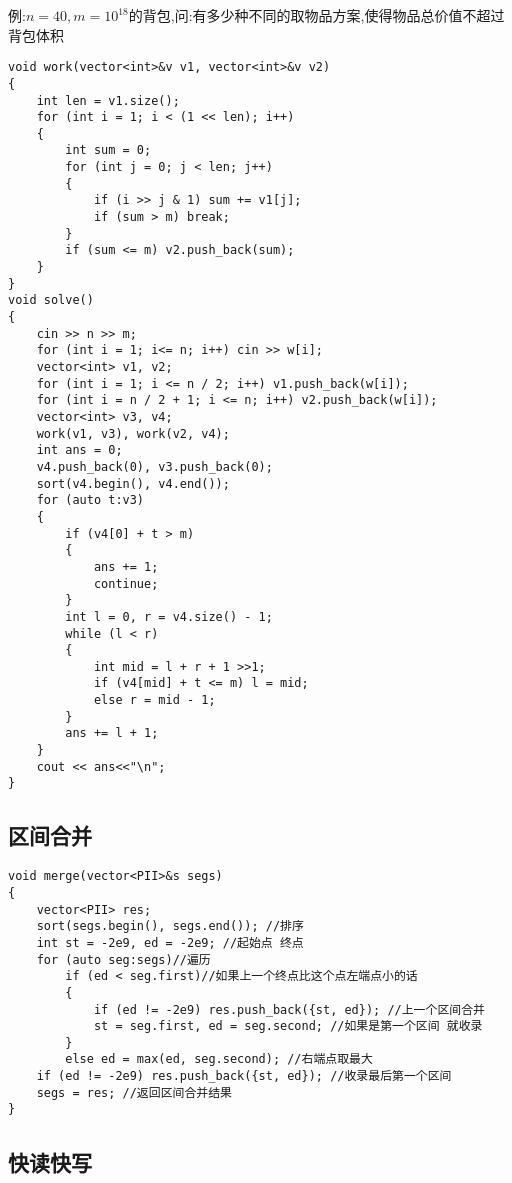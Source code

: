 \documentclass[a4paper, fontset=none]{ctexart}
\begin{document}
例:$n=40, m=10^{18}$的背包,问:有多少种不同的取物品方案,使得物品总价值不超过背包体积

\begin{verbatim}
void work(vector<int>&v v1, vector<int>&v v2)
{
    int len = v1.size();
    for (int i = 1; i < (1 << len); i++)
    {
        int sum = 0;
        for (int j = 0; j < len; j++)
        {
            if (i >> j & 1) sum += v1[j];
            if (sum > m) break;
        }
        if (sum <= m) v2.push_back(sum);
    }
}
void solve()
{
    cin >> n >> m;
    for (int i = 1; i<= n; i++) cin >> w[i];
    vector<int> v1, v2;
    for (int i = 1; i <= n / 2; i++) v1.push_back(w[i]);
    for (int i = n / 2 + 1; i <= n; i++) v2.push_back(w[i]);
    vector<int> v3, v4;
    work(v1, v3), work(v2, v4);
    int ans = 0;
    v4.push_back(0), v3.push_back(0);
    sort(v4.begin(), v4.end());
    for (auto t:v3)
    {
        if (v4[0] + t > m)
        {
            ans += 1;
            continue;
        }
        int l = 0, r = v4.size() - 1;
        while (l < r)
        {
            int mid = l + r + 1 >>1;
            if (v4[mid] + t <= m) l = mid;
            else r = mid - 1;
        }
        ans += l + 1;
    }
    cout << ans<<"\n";
}
\end{verbatim}
\subsection{区间合并}

\begin{verbatim}
void merge(vector<PII>&s segs)
{
    vector<PII> res;
    sort(segs.begin(), segs.end()); //排序
    int st = -2e9, ed = -2e9; //起始点 终点
    for (auto seg:segs)//遍历
        if (ed < seg.first)//如果上一个终点比这个点左端点小的话
        {
            if (ed != -2e9) res.push_back({st, ed}); //上一个区间合并
            st = seg.first, ed = seg.second; //如果是第一个区间 就收录
        }
        else ed = max(ed, seg.second); //右端点取最大
    if (ed != -2e9) res.push_back({st, ed}); //收录最后第一个区间
    segs = res; //返回区间合并结果
}
\end{verbatim}
\subsection{快读快写}
\end{document}
